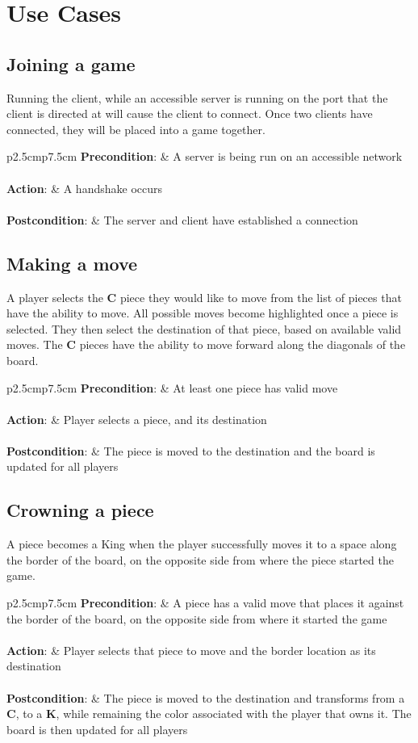 \documentclass[letterpaper]{article}
\newcommand{\prepost}[3]
{
    \begin{tabulary}{\linewidth}{p{2.5cm}p{7.5cm}}
    \textbf{Precondition}:  & #1\\\\
    \textbf{Action}:        & #2\\\\
    \textbf{Postcondition}: & #3\\
    \end{tabulary}
}
\begin{document}
\section{Use Cases}
\label{sec:usecases}

\subsection{Joining a game}
\label{sec:usecases_joining}

Running the client, while an accessible server is running on
the port that the client is directed at will cause the client
to connect. Once two clients have connected, they will be placed
into a game together.\\

\prepost
{A server is being run on an accessible network}
{A handshake occurs}
{The server and client have established a connection}

\subsection{Making a move}
\label{sec:usecases_move}

A player selects the \textbf{C} piece they would like to move
from the list of pieces that have the ability to move. All
possible moves become highlighted once a piece is selected. They
then select the destination of that piece, based on available
valid moves. The \textbf{C} pieces have the ability to move
forward along the diagonals of the board.\\

\prepost
{At least one piece has valid move}
{Player selects a piece, and its destination}
{The piece is moved to the destination and the board is updated
for all players}

\subsection{Crowning a piece}
\label{sec:usecases_king}

A piece becomes a King when the player successfully moves it to
a space along the border of the board, on the opposite side from
where the piece started the game.\\

\prepost
{A piece has a valid move that places it against the border of
the board, on the opposite side from where it started the game}
{Player selects that piece to move and the border location as
its destination}
{The piece is moved to the destination and transforms from a
\textbf{C}, to a \textbf{K}, while remaining the color
associated with the player that owns it. The board is then
updated for all players}
\end{document}
